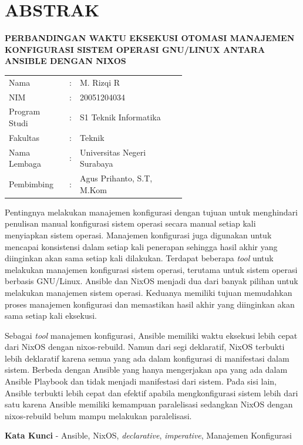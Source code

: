 \documentclass[10pt,twoside]{report}
\begin{document}
\chapter*{ABSTRAK}
\begin{adjustwidth}{0.0cm}{}
	\begin{center}
		\textbf{PERBANDINGAN WAKTU EKSEKUSI OTOMASI MANAJEMEN KONFIGURASI SISTEM OPERASI GNU/LINUX ANTARA ANSIBLE DENGAN NIXOS}
	\end{center}
	\medskip
	\begin{adjustwidth}{0.0cm}{}
		\begin{tabular}{@{}lcp{0.6\linewidth}}
			Nama          & : & M. Rizqi R                  \\
			NIM           & : & 20051204034                 \\
			Program Studi & : & S1 Teknik Informatika       \\
			Fakultas      & : & Teknik                      \\
			Nama Lembaga  & : & Universitas Negeri Surabaya \\
			Pembimbing    & : & Agus Prihanto, S.T, M.Kom   \\
		\end{tabular}
	\end{adjustwidth}
	\medskip

	Pentingnya melakukan manajemen konfigurasi dengan tujuan untuk menghindari
	penulisan manual konfigurasi sistem operasi secara manual setiap kali
	menyiapkan sistem operasi. Manajemen konfigurasi juga digunakan untuk
	mencapai konsistensi dalam setiap kali penerapan sehingga hasil akhir yang
	diinginkan akan sama setiap kali dilakukan. Terdapat beberapa \textit{tool}
	untuk melakukan manajemen konfigurasi sistem operasi, terutama untuk sistem
	operasi berbasis GNU/Linux. Ansible dan NixOS menjadi dua dari banyak pilihan
	untuk melakukan manajemen sistem operasi. Keduanya memiliki tujuan memudahkan
	proses manajemen konfigurasi dan memastikan hasil akhir yang diinginkan akan
	sama setiap kali eksekusi.

	Sebagai \textit{tool} manajemen konfigurasi, Ansible memiliki waktu eksekusi
	lebih cepat dari NixOS dengan nixos-rebuild. Namun dari segi deklaratif,
	NixOS terbukti lebih deklaratif karena semua yang ada dalam konfigurasi di
	manifestasi dalam sistem. Berbeda dengan Ansible yang hanya mengerjakan apa
	yang ada dalam Ansible Playbook dan tidak menjadi manifestasi dari sistem.
	Pada sisi lain, Ansible terbukti lebih cepat dan efektif apabila
	mengkonfigurasi sistem lebih dari satu karena Ansible memiliki kemampuan
	paralelisasi sedangkan NixOS dengan nixos-rebuild belum mampu melakukan
	paralelisasi.
	\medskip

	\noindent\textbf{Kata Kunci} - Ansible, NixOS, \textit{declarative}, \textit{imperative},
	Manajemen Konfigurasi
\end{adjustwidth}
\newpage
\end{document}
